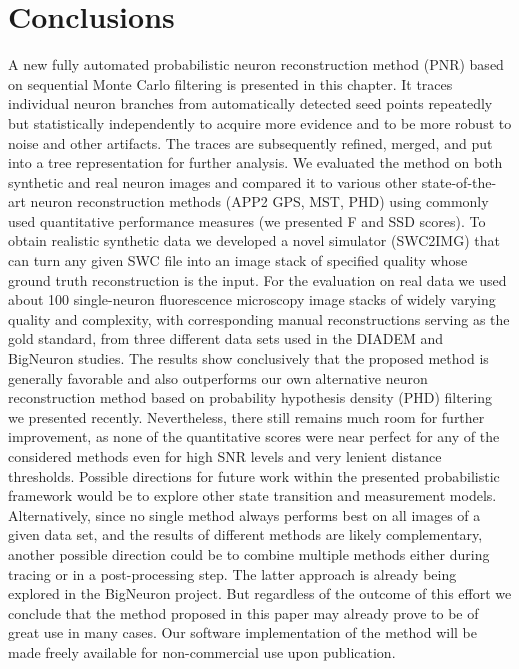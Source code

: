 \section{Conclusions} 
\label{sec:conclusions}
A new fully automated probabilistic neuron reconstruction method (PNR) based on sequential Monte Carlo filtering is presented in this chapter. It traces individual neuron branches from automatically detected seed points repeatedly but statistically independently to acquire more evidence and to be more robust to noise and other artifacts. The traces are subsequently refined, merged, and put into a tree representation for further analysis. We evaluated the method on both synthetic and real neuron images and compared it to various other state-of-the-art neuron reconstruction methods (APP2 GPS, MST, PHD) using commonly used quantitative performance measures (we presented F and SSD scores). To obtain realistic synthetic data we developed a novel simulator (SWC2IMG) that can turn any given SWC file into an image stack of specified quality whose ground truth reconstruction is the input. For the evaluation on real data we used about 100 single-neuron fluorescence microscopy image stacks of widely varying quality and complexity, with corresponding manual reconstructions serving as the gold standard, from three different data sets used in the DIADEM and BigNeuron studies. The results show conclusively that the proposed method is generally favorable and also outperforms our own alternative neuron reconstruction method based on probability hypothesis density (PHD) filtering we presented recently. Nevertheless, there still remains much room for further improvement, as none of the quantitative scores were near perfect for any of the considered methods even for high SNR levels and very lenient distance thresholds. Possible directions for future work within the presented probabilistic framework would be to explore other state transition and measurement models. Alternatively, since no single method always performs best on all images of a given data set, and the results of different methods are likely complementary, another possible direction could be to combine multiple methods either during tracing or in a post-processing step. The latter approach is already being explored in the BigNeuron project. But regardless of the outcome of this effort we conclude that the method proposed in this paper may already prove to be of great use in many cases. Our software implementation of the method will be made freely available for non-commercial use upon publication.
